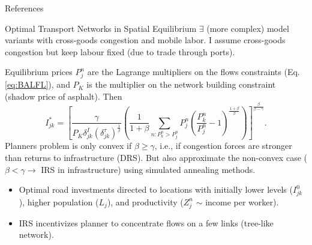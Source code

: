 \documentclass[aspectratio=169,xcolor=dvipsnames]{beamer}
\begin{document}
\setcounter{framenumber}{0}
\renewcommand{\insertframenumber}{R\arabic{framenumber}}

\begin{frame}{References}

\end{frame}


\appendix
\setcounter{framenumber}{0}
\renewcommand{\insertframenumber}{A\arabic{framenumber}}
\setcounter{table}{0}
\renewcommand{\thetable}{A\arabic{table}}
\setcounter{figure}{0}
\renewcommand{\thefigure}{A\arabic{figure}}

\begin{frame}[label=GEModelSol]{Optimal Transport Networks in Spatial Equilibrium \quad \hyperlink{GEModel}{}}
$\exists$ (more complex) model variants with cross-goods congestion and mobile labor. I assume cross-goods congestion but keep labour fixed (due to trade through ports).  \\ \vspace{4mm}

Equilibrium prices $P^n_j$ are the Lagrange multipliers on the flows constraints (Eq. \ref{eq:BALFL}), and $P_K$ is the multiplier on the network building constraint (shadow price of asphalt). Then 
\begin{equation}
I^*_{jk} = \left[ \frac{\gamma}{P_K \delta^I_{jk} (\delta^\tau_{jk})^{\frac{1}{\beta}}} \left( \frac{1}{1+\beta} \sum_{n: P^n_k > P^n_j} P^n_j \left( \frac{P^n_k}{P^n_j} - 1 \right)^{\frac{1+\beta}{\beta}} \right) \right]^{\frac{\beta}{\beta-\gamma}}.
\end{equation}
Planners problem is only convex if $\beta \geq \gamma$, i.e., if congestion forces are stronger than returns to infrastructure (DRS). But \citet{fajgelbaum2020optimal} also approximate the non-convex case ($\beta < \gamma \to$ IRS in infrastructure) using simulated annealing methods. \\\vspace{2mm}
\begin{itemize}
\item Optimal road investments directed to locations with initially lower levels ($I^0_{jk}$), higher population ($L_j$), and productivity ($Z_j^n$ $\sim$ income per worker). 
\item IRS incentivizes planner to concentrate flows on a few links (tree-like network).
\end{itemize}
\end{frame}
\end{document}
